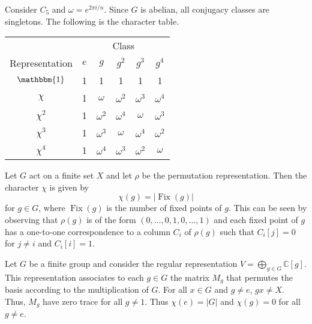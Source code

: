 \begin{example}
    Consider $C_5$ and $\omega = e^{2\pi i/n}$. Since $G$ is abelian, all conjugacy classes are singletons. The following is the character table.
    \begin{center}
        \begin{tabular}{cccccc}
            \toprule
                           & \multicolumn{5}{c}{Class}                                                     \\
            \cmidrule{2-6}
            Representation & $e$                       & $g$        & $g^2$      & $g^3$      & $g^4$      \\
            \midrule
            $\mathbbm{1}$  & 1                         & 1          & 1          & 1          & 1          \\
            $\chi$         & 1                         & $\omega$   & $\omega^2$ & $\omega^3$ & $\omega^4$ \\
            $\chi^2$       & 1                         & $\omega^2$ & $\omega^4$ & $\omega$   & $\omega^3$ \\
            $\chi^3$       & 1                         & $\omega^3$ & $\omega$   & $\omega^4$ & $\omega^2$ \\
            $\chi^4$       & 1                         & $\omega^4$ & $\omega^3$ & $\omega^2$ & $\omega$   \\
            \bottomrule
        \end{tabular}
    \end{center}
\end{example}

\begin{example}
    Let $G$ act on a finite set $X$ and let $\rho$ be the permutation representation. Then the character $\chi$ is given by
    \[ \chi(g) = \lvert \operatorname{Fix}(g) \rvert \]
    for $g \in G$, where $\operatorname{Fix}(g)$ is the number of fixed points of $g$. This can be seen by observing that $\rho(g)$ is of the form $(0, \ldots, 0, 1, 0, \ldots, 1)$ and each fixed point of $g$ has a one-to-one correspondence to a column $C_i$ of $\rho(g)$ such that $C_i[j] = 0$ for $j \neq i$ and $C_i[i] = 1$.
\end{example}

\begin{example}
    Let $G$ be a finite group and consider the regular representation $V = \bigoplus_{g \in G} \mathbb C[g]$. This representation associates to each $g \in G$ the matrix $M_g$ that permutes the basis according to the multiplication of $G$. For all $x \in G$ and $g \neq e$, $gx \neq X$. Thus, $M_g$ have zero trace for all $g \neq 1$. Thus $\chi(e) = \lvert G \rvert$ and $\chi(g) = 0$ for all $g \neq e$.
\end{example}

